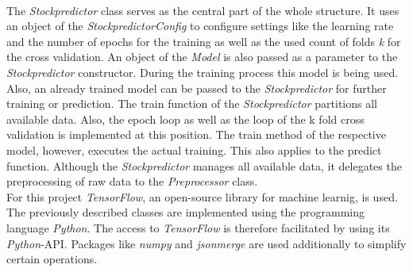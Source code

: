 \\
The \textit{Stockpredictor} class serves as the central part of the whole structure. It uses an object of the \textit{StockpredictorConfig} to configure settings like the learning rate and the number of epochs for the training as well as the used count of folds \textit{k} for the cross validation. An object of the \textit{Model} is also passed as a parameter to the \textit{Stockpredictor} constructor. During the training process this model is being used. Also, an already trained model can be passed to the \textit{Stockpredictor} for further training or prediction. The train function of the \textit{Stockpredictor} partitions all available data. Also, the epoch loop as well as the loop of the k fold cross validation is implemented at this position. The train method of the respective model, however, executes the actual training. This also applies to the predict function. Although the \textit{Stockpredictor} manages all available data, it delegates the preprocessing of raw data to the \textit{Preprocessor} class. 
\\
For this project \textit{TensorFlow}, an open-source library for machine learnig, is used. The previously described classes are implemented using the programming language \textit{Python}. The access to \textit{TensorFlow} is therefore facilitated by using its \textit{Python}-API. Packages like \textit{numpy} and \textit{jsonmerge} are used additionally to simplify certain operations. 